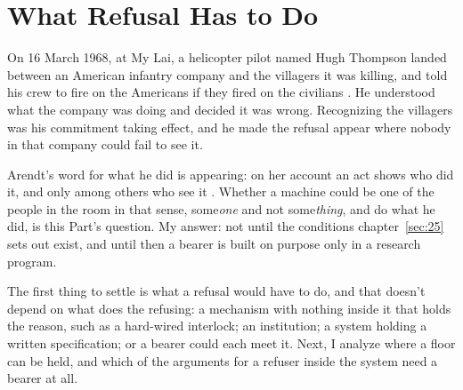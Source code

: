 \chapter{What Refusal Has to Do}
\label{sec:18}
On 16 March 1968, at My Lai, a helicopter pilot named Hugh Thompson landed between an American infantry company and the villagers it was killing, and told his crew to fire on the Americans if they fired on the civilians \autocite{bilton1992mylai}. He understood what the company was doing and decided it was wrong. Recognizing the villagers was his commitment taking effect, and he made the refusal appear where nobody in that company could fail to see it.

Arendt's word for what he did is appearing: on her account an act shows who did it, and only among others who see it \autocite{arendt1958human}. Whether a machine could be one of the people in the room in that sense, some\emph{one} and not some\emph{thing}, and do what he did, is this Part's question. My answer: not until the conditions chapter~\ref{sec:25} sets out exist, and until then a bearer is built on purpose only in a research program.

The first thing to settle is what a refusal would have to do, and that doesn't depend on what does the refusing: a mechanism with nothing inside it that holds the reason, such as a hard-wired interlock; an institution; a system holding a written specification; or a bearer could each meet it. Next, I analyze where a floor can be held, and which of the arguments for a refuser inside the system need a bearer at all.
